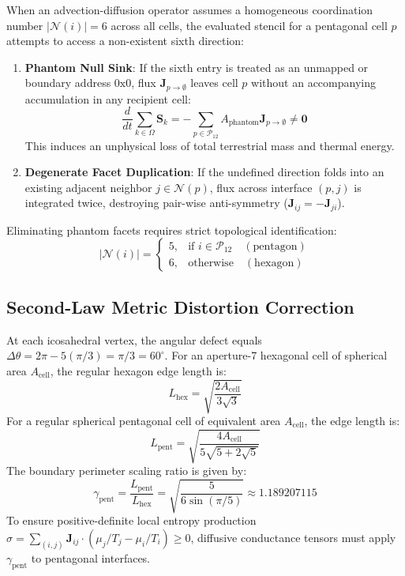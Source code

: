 \documentclass[10pt,twocolumn]{article}
\begin{document}
When an advection-diffusion operator assumes a homogeneous coordination number $|\mathcal{N}(i)| = 6$ across all cells, the evaluated stencil for a pentagonal cell $p$ attempts to access a non-existent sixth direction:
\begin{enumerate}
    \item \textbf{Phantom Null Sink}: If the sixth entry is treated as an unmapped or boundary address $0\text{x}0$, flux $\mathbf{J}_{p \to \emptyset}$ leaves cell $p$ without an accompanying accumulation in any recipient cell:
    \begin{equation}
    \frac{d}{dt} \sum_{k \in \Omega} \mathbf{S}_k = - \sum_{p \in \mathcal{P}_{12}} A_{\text{phantom}} \mathbf{J}_{p \to \emptyset} \ne \mathbf{0}
    \end{equation}
    This induces an unphysical loss of total terrestrial mass and thermal energy.
    \item \textbf{Degenerate Facet Duplication}: If the undefined direction folds into an existing adjacent neighbor $j \in \mathcal{N}(p)$, flux across interface $(p, j)$ is integrated twice, destroying pair-wise anti-symmetry ($\mathbf{J}_{ij} = -\mathbf{J}_{ji}$).
\end{enumerate}

Eliminating phantom facets requires strict topological identification:
\begin{equation}
|\mathcal{N}(i)| = 
\begin{cases}
5, & \text{if } i \in \mathcal{P}_{12} \quad (\text{pentagon}) \\
6, & \text{otherwise} \quad (\text{hexagon})
\end{cases}
\end{equation}

\subsection{Second-Law Metric Distortion Correction}

At each icosahedral vertex, the angular defect equals $\Delta \theta = 2\pi - 5(\pi/3) = \pi/3 = 60^\circ$. For an aperture-7 hexagonal cell of spherical area $A_{\text{cell}}$, the regular hexagon edge length is:
\begin{equation}
L_{\text{hex}} = \sqrt{\frac{2 A_{\text{cell}}}{3 \sqrt{3}}}
\end{equation}
For a regular spherical pentagonal cell of equivalent area $A_{\text{cell}}$, the edge length is:
\begin{equation}
L_{\text{pent}} = \sqrt{\frac{4 A_{\text{cell}}}{5 \sqrt{5 + 2\sqrt{5}}}}
\end{equation}
The boundary perimeter scaling ratio is given by:
\begin{equation}
\gamma_{\text{pent}} = \frac{L_{\text{pent}}}{L_{\text{hex}}} = \sqrt{\frac{5}{6 \sin(\pi/5)}} \approx 1.189207115
\end{equation}
To ensure positive-definite local entropy production $\sigma = \sum_{(i,j)} \mathbf{J}_{ij} \cdot (\mu_j/T_j - \mu_i/T_i) \ge 0$, diffusive conductance tensors must apply $\gamma_{\text{pent}}$ to pentagonal interfaces.
\end{document}
